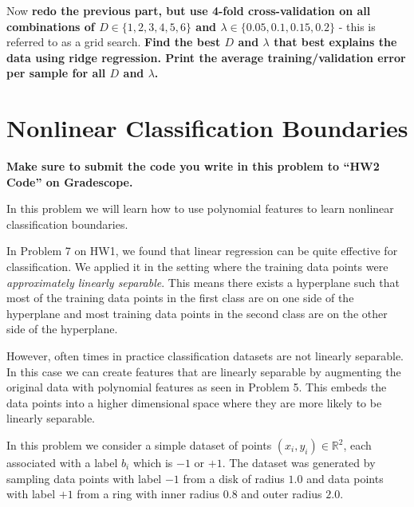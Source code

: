 \documentclass[preview]{standalone}
\begin{document}
\begin{Parts}
\Part Now {\bf redo the previous part, but use 4-fold cross-validation on all combinations of $D
\in \{1, 2,3,4,5,6\} $ and $\lambda \in \{0.05, 0.1, 0.15, 0.2\}$} - this is referred to as a grid
search. {\bf Find the best $D$ and $\lambda$ that best explains the data using ridge regression.
Print the average training/validation error per sample for all $D$ and $\lambda$.}


\end{Parts}

\newcommand{\R}{\mathbb{R}}

\section{Nonlinear Classification Boundaries}

\textbf{Make sure to submit the code you write in this problem to ``HW2 Code'' on Gradescope.}

In this problem we will learn how to use polynomial features to learn
nonlinear classification boundaries.

In Problem 7 on HW1, we found that linear regression can be quite effective
for classification. We applied it in the setting where the training data points
were \emph{approximately linearly separable}. This means there exists a hyperplane such that most
of the training data points in the first class are on one side of the hyperplane
and most training data points in the second class are on the other side of the
hyperplane.

However, often times in practice classification datasets are not linearly
separable. In this case we can create features that are linearly separable by augmenting
the original data with polynomial features as seen in Problem 5. This embeds the data points into a
higher dimensional space where they are more likely to be linearly separable.

In this problem we consider a simple dataset of points $(x_i, y_i) \in \R^2$, each
associated with a label $b_i$ which is $-1$ or $+1$. The dataset was generated by sampling
data points with label $-1$ from a disk of radius $1.0$ and data points with label
$+1$ from a ring with inner radius $0.8$ and outer radius $2.0$.
\end{document}
